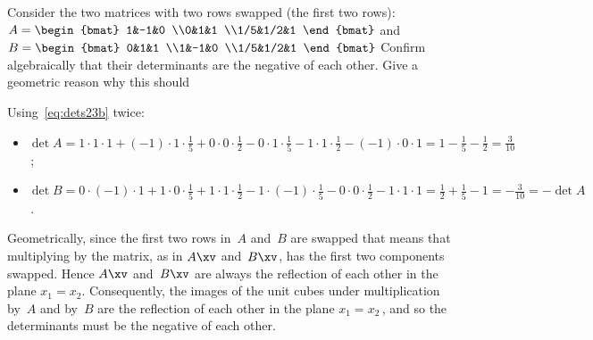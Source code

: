 \begin{example} \label{eg:detswap}
Consider the two matrices with two rows swapped (the first two rows):
\(A=\begin{bmat} 1&-1&0
\\0&1&1
\\1/5&1/2&1 \end{bmat}\) and
\(B=\begin{bmat} 0&1&1
\\1&-1&0
\\1/5&1/2&1 \end{bmat}\)
Confirm algebraically that their determinants are the negative of each other.
Give a geometric reason why this should 
\begin{solution} 
Using~\eqref{eq:dets23b} twice: 
\begin{itemize}
\item \(\det A 
=1\cdot1\cdot1 +(-1)\cdot1\cdot\frac15 +0\cdot0\cdot\frac12
-0\cdot1\cdot\frac15 -1\cdot1\cdot\frac12 -(-1)\cdot0\cdot1 
=1-\frac15-\frac12=\frac3{10}\)\,;  
\item \(\det B =0\cdot(-1)\cdot1 
+1\cdot0\cdot\frac15 
+1\cdot1\cdot\frac12
-1\cdot(-1)\cdot\frac15 
-0\cdot0\cdot\frac12 
-1\cdot1\cdot1 
=\frac12+\frac15-1=-\frac3{10}=-\det A\)\,.
\end{itemize}
  

Geometrically, since the first two rows in~\(A\) and~\(B\) are swapped that means that multiplying by the matrix, as in \(A\xv\) and~\(B\xv\), has the first two components swapped.
Hence \(A\xv\) and~\(B\xv\) are always the reflection of each other in the plane \(x_1=x_2\).
Consequently, the images of the unit cubes under multiplication by~\(A\) and by~\(B\) are the reflection of each other in the plane \(x_1=x_2\)\,, 
and so the determinants must be the negative of each other.
\end{solution}
\end{example}




